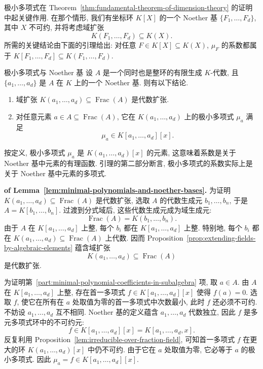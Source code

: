 极小多项式在 Theorem~\ref{thm:fundamental-theorem-of-dimension-theory} 的证明中起关键作用. 在那个情形, 我们有坐标环 $K[X]$ 的一个 Noether 基 $\{F_{1},\ldots,F_{d}\}$, 其中 $X$ 不可约, 并将考虑域扩张
\[
  K(F_{1},\ldots,F_{d})\subseteq K(X).
\]
所需的关键结论由下面的引理给出: 对任意 $F\in K[X]\subseteq K(X)$, $\mu_{F}$ 的系数都属于 $K[F_{1},\ldots,F_{d}]\subseteq K(F_{1},\ldots,F_{d})$.

\begin{Lemma}{极小多项式与 Noether 基}\leavevmode\label{lem:minimal-polynomials-and-noether-bases}
设 $A$ 是一个同时也是整环的有限生成 $K$-代数, 且 $\{a_{1},\ldots,a_{d}\}$ 是 $A$ 在 $K$ 上的一个 Noether 基. 则有以下结论.
\begin{enumerate}
  \item 域扩张 $K(a_{1},\ldots,a_{d})\subseteq\operatorname{Frac}(A)$ 是代数扩张.
  \item\label{part:minimal-polynomial-coefficients-in-subalgebra} 对任意元素 $a\in A\subseteq\operatorname{Frac}(A)$, 它在 $K(a_{1},\ldots,a_{d})$ 上的极小多项式 $\mu_{a}$ 满足
  \[
    \mu_{a}\in K[a_{1},\ldots,a_{d}][x].
  \]
\end{enumerate}
\end{Lemma}

按定义, 极小多项式 $\mu_{a}$ 是 $K(a_{1},\ldots,a_{d})[x]$ 的元素, 这意味着系数是关于 Noether 基中元素的有理函数. 引理的第二部分断言, 极小多项式的系数实际上是关于 Noether 基中元素的多项式.

\begin{Proof}\textbf{of Lemma~\ref{lem:minimal-polynomials-and-noether-bases}.}\quad
为证明 $K(a_{1},\ldots,a_{d})\subseteq\operatorname{Frac}(A)$ 是代数扩张, 选取 $A$ 的代数生成元 $b_{1},\ldots,b_{n}$, 于是 $A=K[b_{1},\ldots,b_{n}]$. 过渡到分式域后, 这些代数生成元成为域生成元:
\[
  \operatorname{Frac}(A)=K(b_{1},\ldots,b_{n}).
\]
由于 $A$ 在 $K[a_{1},\ldots,a_{d}]$ 上整, 每个 $b_{i}$ 都在 $K[a_{1},\ldots,a_{d}]$ 上整. 特别地, 每个 $b_{i}$ 都在 $K(a_{1},\ldots,a_{d})\subseteq\operatorname{Frac}(A)$ 上代数. 因而 Proposition~\ref{prop:extending-fields-by-algebraic-elements} 蕴含域扩张
\[
  K(a_{1},\ldots,a_{d})\subseteq\operatorname{Frac}(A)
\]
是代数扩张.

为证明第~\ref{part:minimal-polynomial-coefficients-in-subalgebra} 项, 取 $a\in A$. 由 $A$ 在 $K[a_{1},\ldots,a_{d}]$ 上整, 存在首一多项式 $f\in K[a_{1},\ldots,a_{d}][x]$ 使得 $f(a)=0$. 选取 $f$, 使它在所有在 $a$ 处取值为零的首一多项式中次数最小, 此时 $f$ 还必须不可约. 不妨设 $a_{1},\ldots,a_{d}$ 互不相同. Noether 基的定义蕴含 $a_{1},\ldots,a_{d}$ 代数独立, 因此 $f$ 是多元多项式环中的不可约元:
\[
  f\in K[a_{1},\ldots,a_{d}][x]=K[a_{1},\ldots,a_{d},x].
\]
反复利用 Proposition~\ref{lem:irreducible-over-fraction-field}, 可知首一多项式 $f$ 在更大的环 $K(a_{1},\ldots,a_{d})[x]$ 中仍不可约. 由于它在 $a$ 处取值为零, 它必等于 $a$ 的极小多项式. 因此 $\mu_{a}=f\in K[a_{1},\ldots,a_{d}][x]$.
\end{Proof}

